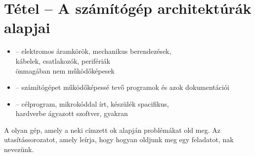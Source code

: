\documentclass[main.tex]{subfiles}
\begin{document}
  \section{Tétel – A számítógép architektúrák alapjai} %

  \begin{itemize}
    \item {} \tabto{2cm} – \tabto{2.6cm}
    elektromos áramkörök, mechanikus berendezések, \\
    \tabto{2.6cm}kábelek, csatlakozók, perifériák \\
    \tabto{2.6cm}önmagában nem működőképesek
    
    \item {} \tabto{2cm} – \tabto{2.6cm}
    számítógépet működőképessé tevő
    programok és azok dokumentációi

    \item {} \tabto{2cm} – \tabto{2.6cm}
    célprogram, mikrokóddal írt, készülék spacifikus, \\
    \tabto{2.6cm}hardverbe ágyazott szoftver,
    gyakran 
  \end{itemize}

  A  olyan gép,
  amely a neki címzett ok alapján
  problémákat old meg. Az utasítássorozatot,
  amely leírja, hogy hogyan oldjunk meg egy feladatot,
  nak nevezünk.
\end{document}
